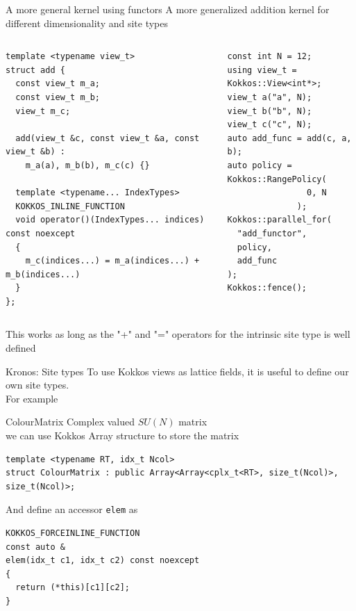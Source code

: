 \begin{frame}[fragile]{A more general kernel using functors}
  A more generalized addition kernel for different dimensionality and site types
  \begin{columns}
      \begin{verbatim}
template <typename view_t>
struct add {
  const view_t m_a;
  const view_t m_b;
  view_t m_c;

  add(view_t &c, const view_t &a, const view_t &b) :
    m_a(a), m_b(b), m_c(c) {}
  
  template <typename... IndexTypes>
  KOKKOS_INLINE_FUNCTION
  void operator()(IndexTypes... indices) const noexcept
  {
    m_c(indices...) = m_a(indices...) + m_b(indices...)
  }
};
      \end{verbatim}
      \begin{verbatim}
const int N = 12;
using view_t = Kokkos::View<int*>;
view_t a("a", N);
view_t b("b", N);
view_t c("c", N);
auto add_func = add(c, a, b);
auto policy = Kokkos::RangePolicy(
                0, N
              );
Kokkos::parallel_for(
  "add_functor",
  policy,
  add_func
);
Kokkos::fence();
      \end{verbatim}
  \end{columns}

  This works as long as the "+" and "=" operators for the intrinsic site type is well defined
\end{frame}

\begin{frame}[fragile]{Kronos: Site types}
  To use Kokkos views as lattice fields, it is useful to define our own site types.\\

  For example
  \begin{block}{ColourMatrix}
    Complex valued $SU(N)$ matrix\\
    we can use Kokkos Array structure to
    store the matrix
  \end{block}


  \begin{verbatim}
template <typename RT, idx_t Ncol>
struct ColourMatrix : public Array<Array<cplx_t<RT>, size_t(Ncol)>, size_t(Ncol)>;
  \end{verbatim}
  
  And define an accessor \verb|elem| as

  \begin{verbatim}
KOKKOS_FORCEINLINE_FUNCTION
const auto &
elem(idx_t c1, idx_t c2) const noexcept
{
  return (*this)[c1][c2];
}
  \end{verbatim}

\end{frame}

